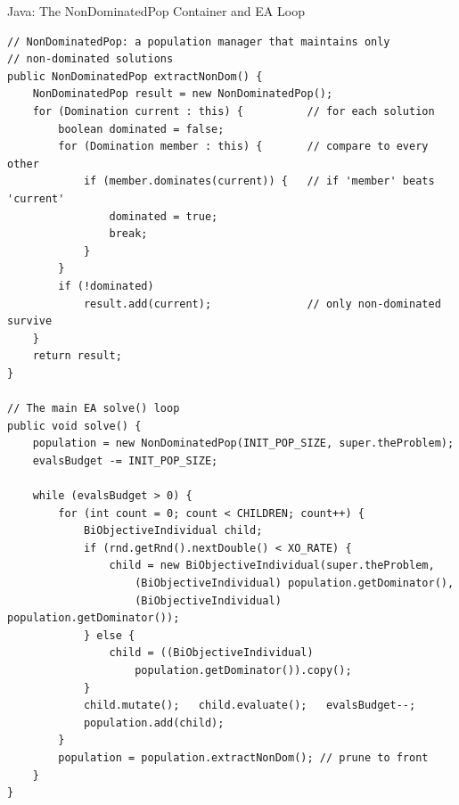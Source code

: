 \documentclass[aspectratio=169,10pt]{beamer}
\begin{document}
\begin{frame}[fragile]{Java: The NonDominatedPop Container and EA Loop}
\begin{lstlisting}[language=JavaBook]
// NonDominatedPop: a population manager that maintains only
// non-dominated solutions
public NonDominatedPop extractNonDom() {
    NonDominatedPop result = new NonDominatedPop();
    for (Domination current : this) {          // for each solution
        boolean dominated = false;
        for (Domination member : this) {       // compare to every other
            if (member.dominates(current)) {   // if 'member' beats 'current'
                dominated = true;
                break;
            }
        }
        if (!dominated)
            result.add(current);               // only non-dominated survive
    }
    return result;
}

// The main EA solve() loop
public void solve() {
    population = new NonDominatedPop(INIT_POP_SIZE, super.theProblem);
    evalsBudget -= INIT_POP_SIZE;

    while (evalsBudget > 0) {
        for (int count = 0; count < CHILDREN; count++) {
            BiObjectiveIndividual child;
            if (rnd.getRnd().nextDouble() < XO_RATE) {
                child = new BiObjectiveIndividual(super.theProblem,
                    (BiObjectiveIndividual) population.getDominator(),
                    (BiObjectiveIndividual) population.getDominator());
            } else {
                child = ((BiObjectiveIndividual)
                    population.getDominator()).copy();
            }
            child.mutate();   child.evaluate();   evalsBudget--;
            population.add(child);
        }
        population = population.extractNonDom(); // prune to front
    }
}
\end{lstlisting}
\end{frame}
\end{document}
